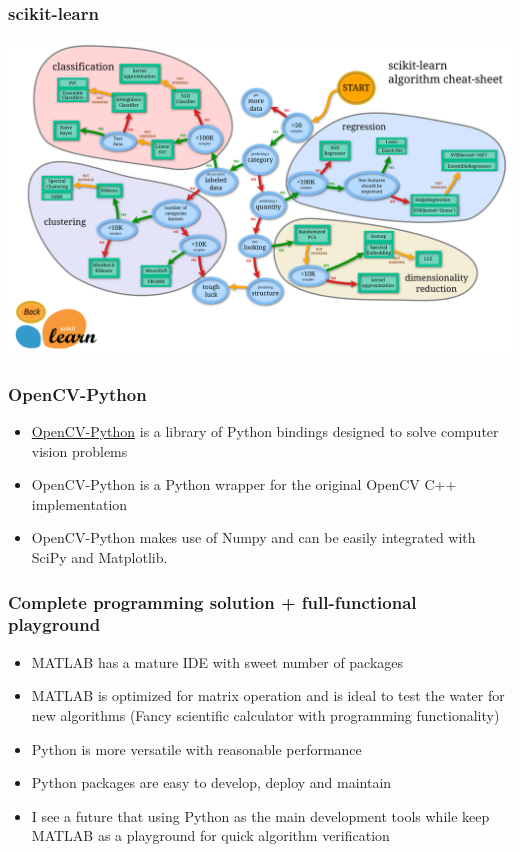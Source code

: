 \documentclass[compress]{beamer}
\begin{document}
\begin{frame}
	\frametitle{scikit-learn}
	\centering
	\includegraphics[width=1.1\textwidth]{fig/ml_map}
\end{frame}

\begin{frame}
	\frametitle{OpenCV-Python}
	\begin{itemize}
		\item \href{http://docs.opencv.org/3.1.0/d0/de3/tutorial\_py\_intro.html\#gsc.tab=0}{OpenCV-Python} is a library of Python bindings designed to solve computer vision problems
		\item OpenCV-Python is a Python wrapper for the original OpenCV C++ implementation
		\item OpenCV-Python makes use of Numpy and can be easily integrated with SciPy and Matplotlib.
	\end{itemize}
\end{frame}

\begin{frame}
	\frametitle{Complete programming solution + full-functional playground}
	\begin{itemize}
		\item MATLAB has a mature IDE with sweet number of packages
		\item MATLAB is optimized for matrix operation and is ideal to test the water for new algorithms (Fancy scientific calculator with programming functionality)
		\vspace{1cm}
		\item Python is more versatile with reasonable performance %
		\item Python packages are easy to develop, deploy and maintain
		\vspace{1cm}
		\item I see a future that using Python as the main development tools while keep MATLAB as a playground for quick algorithm verification
	\end{itemize}
\end{frame}
\end{document}
